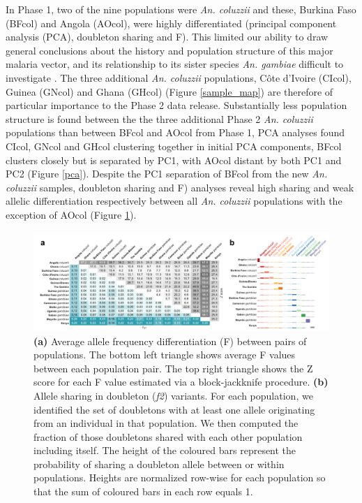 \documentclass[a4paper,11pt,abstracton,hidelinks]{scrartcl}
\begin{document}
%
In Phase 1, two of the nine populations were \textit{An. coluzzii} and these, Burkina Faso (BFcol) and Angola (AOcol), were highly differentiated (principal component analysis (PCA), doubleton sharing and F).
%
This limited our ability to draw general conclusions about the history and population structure of this major malaria vector, and its relationship to its sister species \textit{An. gambiae} difficult to investigate \cite{Ag1000gConsortium2017}.
%
The three additional \textit{An. coluzzii} populations, C\^{o}te d'Ivoire (CIcol), Guinea (GNcol) and Ghana (GHcol) (Figure \ref{sample_map}) are therefore of particular importance to the Phase 2 data release.
%
Substantially less population structure is found between the the three additional Phase 2 \textit{An. coluzzii} populations than between BFcol and AOcol from Phase 1, 
%
PCA analyses found CIcol, GNcol and GHcol clustering together in initial PCA components, BFcol clusters closely but is separated by PC1, with AOcol distant by both PC1 and PC2 (Figure \ref{pca}).
%
Despite the PC1 separation of BFcol from the new \textit{An. coluzzii} samples, doubleton sharing and F) analyses reveal high sharing and weak allelic differentiation respectively between all \textit{An. coluzzii} populations with the exception of AOcol (Figure \ref{fstdbl}).

\begin{figure}[H]
	\begin{center}
		\includegraphics*[width=6.3in]{artwork/structure_composite.pdf}
	\end{center}
	\caption{\textbf{(a)} Average allele frequency differentiation (F) between pairs of populations. The bottom left triangle shows average F values between each population pair. The top right triangle shows the Z score for each F value estimated via a block-jackknife procedure. \textbf{(b)} Allele sharing in doubleton (\textit{f2}) variants. For each population, we identified the set of doubletons with at least one allele originating from an individual in that population. We then computed the fraction of those doubletons shared with each other population including itself. The height of the coloured bars represent the probability of sharing a doubleton allele between or within populations. Heights are normalized row-wise for each population so that the sum of coloured bars in each row equals 1.
}
	\label{fstdbl}
\end{figure}
\end{document}
